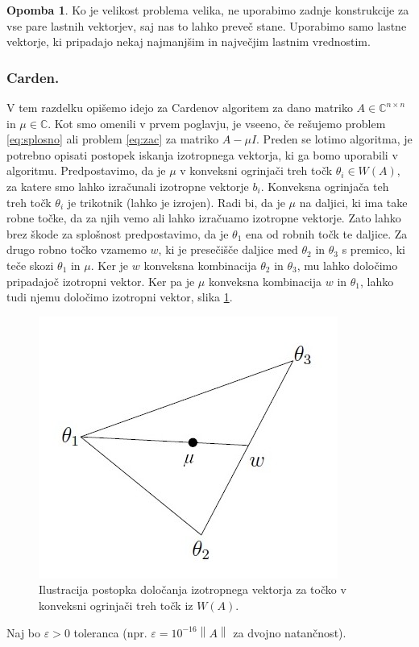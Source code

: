 \documentclass[12pt,a4paper]{amsart}
\theoremstyle{definition}
\newtheorem{opomba}[definicija]{Opomba}
\theoremstyle{plain}
\newcommand{\C}{\mathbb C}
\newcommand{\norm}[1]{\left\lVert#1\right\rVert}
\begin{document}
\begin{opomba}
Ko je velikost problema velika, ne uporabimo zadnje konstrukcije za vse pare lastnih vektorjev, saj nas to lahko preveč stane. Uporabimo samo lastne vektorje, ki pripadajo nekaj najmanjšim in največjim lastnim vrednostim.\\
\end{opomba}
\subsubsection{Carden.}
V tem razdelku opišemo idejo za Cardenov algoritem \cite{carden} za dano matriko $A \in \C^{n\times n}$ in $\mu \in \C$. Kot smo omenili v prvem poglavju, je vseeno, če rešujemo problem \eqref{eq:splosno} ali problem \eqref{eq:zac} za matriko $A-\mu I$. Preden se lotimo algoritma, je potrebno opisati postopek iskanja izotropnega vektorja, ki ga bomo uporabili v algoritmu. Predpostavimo, da je $\mu$ v konveksni ogrinjači treh točk $\theta_i \in W(A)$, za katere smo lahko izračunali izotropne vektorje $b_i$. Konveksna ogrinjača teh treh točk $\theta_i$ je trikotnik (lahko je izrojen). Radi bi, da je $\mu$ na daljici, ki ima take robne točke, da za njih vemo ali lahko izračuamo izotropne vektorje. Zato lahko brez škode za splošnost predpostavimo, da je $\theta_1$ ena od robnih točk te daljice. Za drugo robno točko vzamemo $w$, ki je presečišče daljice med $\theta_2$ in $\theta_3$ s premico, ki teče skozi $\theta_1$ in $\mu$. Ker je $w$ konveksna kombinacija $\theta_2$ in $\theta_3$, mu lahko določimo pripadajoč izotropni vektor.
Ker pa je $\mu$ konveksna kombinacija $w$ in $\theta_1$, lahko tudi njemu določimo izotropni vektor, slika \ref{fig:triangle}.\\
\begin{figure} [h]
\centering
\includegraphics[scale=0.7]{triangle}
\caption{Ilustracija postopka določanja izotropnega vektorja za točko v konveksni ogrinjači treh točk iz $W(A)$.}
\label{fig:triangle}
\end{figure}
Naj bo $\varepsilon >0$ toleranca (npr. $\varepsilon=10^{-16}\norm{A}$ za dvojno natančnost). 
\end{document}

